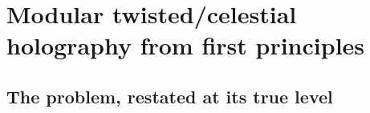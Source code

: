 %
%
\providecommand{\A}{\mathcal A}
\providecommand{\B}{\mathcal B}
\providecommand{\C}{\mathbb C}
\providecommand{\D}{\mathcal D}
\providecommand{\E}{\mathcal E}
\providecommand{\F}{\mathcal F}
\providecommand{\G}{\mathfrak G}
\providecommand{\M}{\mathcal M}
\providecommand{\N}{\mathcal N}
\providecommand{\Q}{\mathbb Q}
\providecommand{\R}{\mathbb R}
\providecommand{\Z}{\mathbb Z}
\providecommand{\mc}{\mathfrak m}
\providecommand{\h}{\hbar}
\providecommand{\id}{\mathrm{id}}
\providecommand{\Hom}{\operatorname{Hom}}
\providecommand{\MC}{\operatorname{MC}}
\providecommand{\Cone}{\operatorname{Cone}}
\providecommand{\Obs}{\operatorname{Obs}}
\providecommand{\Sym}{\operatorname{Sym}}
\providecommand{\Tr}{\operatorname{Tr}}
\providecommand{\Span}{\operatorname{Span}}
\providecommand{\End}{\operatorname{End}}
\providecommand{\Ext}{\operatorname{Ext}}
\providecommand{\Defcyc}{\operatorname{Def}_{\mathrm{cyc}}}
\providecommand{\Ran}{\operatorname{Ran}}
\providecommand{\gr}{\operatorname{gr}}
\providecommand{\Hb}{H_b^{0,\bullet}(S^3)}
\providecommand{\HCR}{H_{\mathrm{CR}}^{0,\bullet}(S^3)}
\providecommand{\delbar}{\bar\partial}
\providecommand{\delbarb}{\bar\partial_b}
\providecommand{\ot}{\widehat\otimes}
\providecommand{\ov}[1]{\overline{#1}}

\section{Modular twisted/celestial holography from first principles}

\subsection{The problem, restated at its true level}

